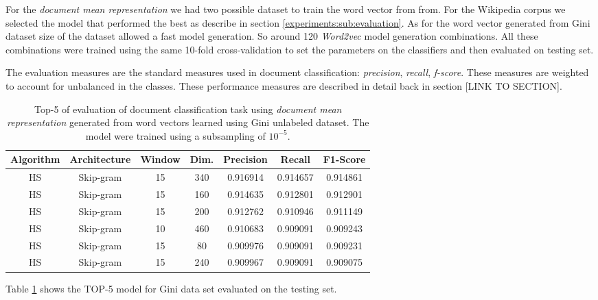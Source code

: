 For the \textit{document mean representation} we had two possible dataset to
train the word vector from from. For the Wikipedia corpus we selected the model that
performed the best as describe in section \ref{experiments:sub:evaluation}. 
As for the word vector generated from Gini dataset 
size of the dataset  allowed a fast model generation. So around 120
\textit{Word2vec} model generation  combinations. All these combinations
were trained using the same 10-fold cross-validation to set the parameters on
the classifiers and then evaluated on testing set.


The evaluation measures are the standard measures used in document
classification: \textit{precision}, \textit{recall}, \textit{f-score}. These
measures are  weighted to account for unbalanced in the classes. These
performance measures are described in detail back in section [LINK TO SECTION].


\begin{table}[h]

  \centering
  \caption{Top-5 of evaluation of document classification task using
    \textit{document mean representation} generated from word vectors learned
  using Gini unlabeled dataset. The model were trained using a subsampling of
  $10^{-5}$.}
  \label{tab:w2v4tc_ginig_w2v_evaluation}

\small
\begin{tabular}{|c|c|c|c|c|c|c|}
\hline
 Algorithm  &  Architecture  &  Window  &  Dim.  &  Precision  &    Recall  &  F1-Score  \\
\hline
 \ac{HS}    &  Skip-gram     &      15  &   340  &   0.916914  &  0.914657  &  0.914861  \\
 \ac{HS}    &  Skip-gram     &      15  &   160  &   0.914635  &  0.912801  &  0.912901  \\
 \ac{HS}    &  Skip-gram     &      15  &   200  &   0.912762  &  0.910946  &  0.911149  \\
 \ac{HS}    &  Skip-gram     &      10  &   460  &   0.910683  &  0.909091  &  0.909243  \\
 \ac{HS}    &  Skip-gram     &      15  &    80  &   0.909976  &  0.909091  &  0.909231  \\
 \ac{HS}    &  Skip-gram     &      15  &   240  &   0.909967  &  0.909091  & 0.909075  \\
\hline
\end{tabular}
\end{table}


Table \ref{tab:w2v4tc_ginig_w2v_evaluation} shows the TOP-5 model for Gini  data set evaluated on the
testing set. 


